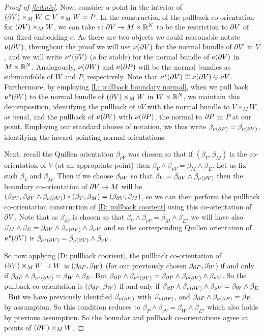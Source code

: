 \begin{proof}[Proof of \cref{leibniz}]
	Now, consider a point in the interior of $(\partial V) \times_M W \subset V \times_M W = P$.
	In the construction of the pullback co-orientation for $(\partial V) \times_M W$, we can take $e \colon \partial V \to M \times \mathbb{R}^N$ to be the restriction to $\partial V$ of our fixed embedding $e$.
	As there are two objects we could reasonable notate $\nu (\partial V)$, throughout the proof we will use $\nu (\partial V)$ for the normal bundle of $\partial V$ in $V$, and we will write $\nu^s(\partial V)$ ($s$ for stable) for the normal bundle of $e(\partial V)$ in $M \times \mathbb{R}^N$.
	Analogously, $\nu(\partial W)$ and $\nu(\partial P)$ will be the normal bundles as submanifolds of $W$ and $P$, respectively.
	Note that $\nu^s(\partial V) \cong \nu(\partial V) \oplus \nu V$.
	Furthermore, by employing \cref{L: pullback boundary normal}, when we pull back $\nu^s(\partial V)$ to the normal bundle of $(\partial V) \times_M W$ in $W \times \mathbb{R}^N$, we maintain this decomposition, identifying the pullback of $\nu V$ with the normal bundle to $V \times_M W$, as usual, and the pullback of $\nu(\partial V)$ with $\nu (\partial P)$, the normal to $\partial P$ in $P$ at our point.
	Employing our standard abuses of notation, we thus write $\beta_{\nu(\partial P)} = \beta_{\nu(\partial V)}$, identifying the inward pointing normal orientations.

	Next, recall the Quillen orientation $\beta_{\nu V}$ was chosen so that if $(\beta_V, \beta_M)$ is the co-orientation of $V$ (at an appropriate point) then $\beta_V \wedge \beta_{\nu V} = \beta_{M} \wedge \beta_E$.
	Let us fix such $\beta_V$ and $\beta_M$.
	Then if we choose $\beta_{\partial V}$ so that $\beta_V = \beta_{\partial V} \wedge \beta_{\nu(\partial V)}$ then the boundary co-orientation of $\partial V \to M$ will be $(\beta_{\partial V}, \beta_{\partial V} \wedge \beta_{\nu(\partial V)}) * (\beta_V, \beta_M) = (\beta_{\partial V},\beta_M)$, so we can then perform the pullback co-orientation construction of \cref{D: pullback coorient} using this co-orientation of $\partial V$.
	Note that as $\beta_{\nu V}$ is chosen so that $\beta_V \wedge \beta_{\nu V} = \beta_M \wedge \beta_E$, we will have also $\beta_M \wedge \beta_E = \beta_{\partial V} \wedge \beta_{\nu(\partial V)} \wedge \beta_{\nu V}$ and so the corresponding Quillen orientation of $\nu^s(\partial V)$ is $\beta_{\nu^s(\partial V)} = \beta_{\nu(\partial V)} \wedge \beta_{\nu V}$.

	So now applying \cref{D: pullback coorient}, the pullback co-orientation of $(\partial V) \times_M W \to W$ is $(\beta_{\partial P},\beta_W)$ (for our previously chosen $\beta_{\partial P}, \beta_W$) if and only if $\beta_{\partial P} \wedge \beta_{\nu^s(\partial V)} = \beta_W \wedge \beta_E$.
	But $\beta_{\partial P} \wedge \beta_{\nu^s(\partial V)} = \beta_{\partial P} \wedge \beta_{\nu(\partial V)} \wedge \beta_{\nu V}$.
	So the pullback co-orientation is $(\beta_{\partial P},\beta_W)$ if and only if $\beta_{\partial P} \wedge \beta_{\nu(\partial V)} \wedge \beta_{\nu V} = \beta_W \wedge \beta_E$.
	But we have previously identified $\beta_{\nu(\partial V)}$ with $\beta_{\nu(\partial P)}$, and $\beta_{\partial P} \wedge \beta_{\nu(\partial P)} = \beta_P$ by assumption.
	So this condition reduces to $\beta_P \wedge \beta_{\nu V} = \beta_W \wedge \beta_E$, which also holds by previous assumption.
	So the boundar and pullback co-orientations agree at points of $(\partial V) \times_M W$.


\end{proof}
